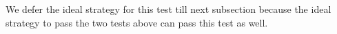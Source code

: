 \documentclass[11pt,letterpaper]{article}
\newcommand{\1}{\mathbb{1}}
\newcommand{\nr}{n(r)}
\newcommand{\fC}{\mathfrak{C}}
\def\carl#1{{\color{blue} #1}}
\theoremstyle{definition}
\begin{document}
We defer the ideal strategy for this test till next subsection because the ideal
strategy to pass the two tests above can pass this test as well.



\end{document}
